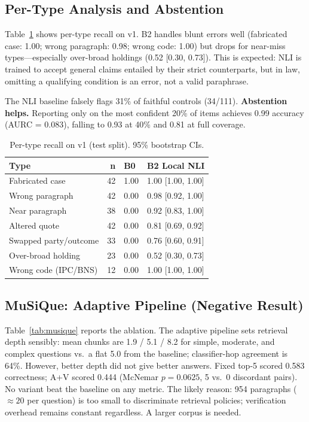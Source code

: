 \documentclass[conference]{IEEEtran}
\begin{document}
\subsection{Per-Type Analysis and Abstention}

Table~\ref{tab:pertype} shows per-type recall on v1. B2 handles blunt errors well (fabricated
case: 1.00; wrong paragraph: 0.98; wrong code: 1.00) but drops for near-miss types---especially
over-broad holdings (0.52 [0.30, 0.73]). This is expected: NLI is trained to accept general
claims entailed by their strict counterparts, but in law, omitting a qualifying condition is an
error, not a valid paraphrase.

The NLI baseline falsely flags 31\% of faithful controls (34/111). \textbf{Abstention helps.}
Reporting only on the most confident 20\% of items achieves 0.99 accuracy (AURC = 0.083),
falling to 0.93 at 40\% and 0.81 at full coverage.

\begin{table}[t]
\centering
\caption{Per-type recall on v1 (test split). 95\% bootstrap CIs.}
\label{tab:pertype}
\renewcommand{\arraystretch}{1.1}
\footnotesize
\begin{tabular}{@{}lrll@{}}
\toprule
\textbf{Type} & \textbf{n} & \textbf{B0} & \textbf{B2 Local NLI} \\
\midrule
Fabricated case       & 42 & 1.00 & 1.00 [1.00, 1.00] \\
Wrong paragraph       & 42 & 0.00 & 0.98 [0.92, 1.00] \\
Near paragraph        & 38 & 0.00 & 0.92 [0.83, 1.00] \\
Altered quote         & 42 & 0.00 & 0.81 [0.69, 0.92] \\
Swapped party/outcome & 33 & 0.00 & 0.76 [0.60, 0.91] \\
Over-broad holding    & 23 & 0.00 & 0.52 [0.30, 0.73] \\
Wrong code (IPC/BNS)  & 12 & 0.00 & 1.00 [1.00, 1.00] \\
\bottomrule
\end{tabular}
\end{table}

\subsection{MuSiQue: Adaptive Pipeline (Negative Result)}
\label{sec:negative}

Table~\ref{tab:musique} reports the ablation. The adaptive pipeline sets retrieval depth sensibly:
mean chunks are 1.9 / 5.1 / 8.2 for simple, moderate, and complex questions vs.\ a flat 5.0 from
the baseline; classifier-hop agreement is 64\%. However, better depth did not give better answers.
Fixed top-5 scored 0.583 correctness; A+V scored 0.444 (McNemar $p = 0.0625$, 5 vs.\ 0
discordant pairs). No variant beat the baseline on any metric. The likely reason: 954 paragraphs
(${\approx}20$ per question) is too small to discriminate retrieval policies; verification overhead
remains constant regardless. A larger corpus is needed.
\end{document}
